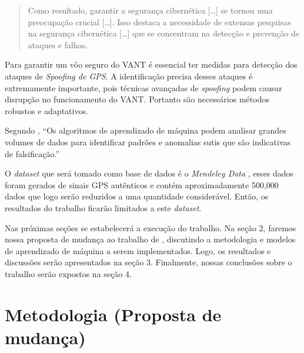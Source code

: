 \documentclass[12pt]{article}
\begin{document}
\begin{quote}
  Como resultado, garantir a segurança cibernética [\dots] se tornou uma preocupação crucial [\dots].
  Isso destaca a necessidade de extensas pesquisas na segurança cibernética [\dots] que se concentram na detecção
  e prevenção de ataques e falhas.  \cite[tradução nossa]{elalamiDroneDefGANtGenerativeAIBased2024}
\end{quote}

Para garantir um vôo seguro do VANT é essencial ter medidas para detecção dos ataques de \textit{Spoofing de GPS}.
A identificação precisa desses ataques é extremamente importante, pois técnicas avançadas de \textit{spoofing}
podem causar disrupção no funcionamento do VANT. Portanto são necessários métodos robustos e adaptativos.
\cite{isleyenGPSSpoofingDetection2024}

Segundo \cite[tradução nossa]{isleyenGPSSpoofingDetection2024},
\enquote{Os algoritmos de aprendizado de máquina podem analisar grandes volumes de dados
para identificar padrões e anomalias sutis que são indicativas de falsificação.}


O \textit{dataset} que será tomado como base de dados é o \textit{Mendeley Data} 
\cite{aissou2022dataset}, esses dados foram gerados de sinais GPS autênticos e 
contém aproximadamente 500,000 dados que logo serão reduzidos a uma quantidade
considerável. Então, os resultados do trabalho ficarão
limitados a este \textit{dataset}.

Nas próximas seções se estabelecerá a execução do trabalho. Na seção 2, faremos 
nossa proposta de mudança ao trabalho de \cite{Aissou2021}, discutindo a 
metodologia e modelos de aprendizado de máquina a
serem implementados. Logo, os resultados e 
discussões serão apresentados na seção 3. Finalmente, nossas conclusões sobre o 
trabalho serão expostos na seção 4.

\section{Metodologia (Proposta de mudança)} %



\lipsum[1-3]


\end{document}

